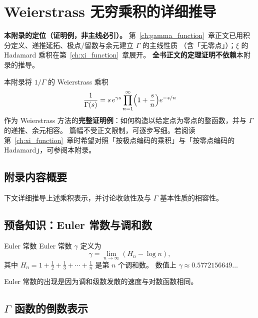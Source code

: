 

\chapter{Weierstrass 无穷乘积的详细推导}
\label{app:weierstrass}

\textbf{本附录的定位（证明例，非主线必引）。}
第~\ref{ch:gamma_function}~章正文已用积分定义、递推延拓、极点/留数与余元建立 $\Gamma$ 的主线性质
（含「无零点」）；$\xi$ 的 Hadamard 乘积在第~\ref{ch:xi_function}~章展开。
\textbf{全书正文的定理证明不依赖}本附录的推导。

本附录将 $1/\Gamma$ 的 Weierstrass 乘积
\[
  \frac{1}{\Gamma(s)}
  = s\, e^{\gamma s}
  \prod_{n=1}^{\infty}\Bigl(1+\frac{s}{n}\Bigr)e^{-s/n}
\]
作为 Weierstrass 方法的\textbf{完整证明例}：如何构造以给定点为零点的整函数，并与 $\Gamma$ 的递推、余元相容。
篇幅不受正文限制，可逐步写细。若阅读第~\ref{ch:xi_function}~章时希望对照「按极点编码的乘积」与「按零点编码的 Hadamard」，可参阅本附录。

\section*{附录内容概要}

下文详细推导上述乘积表示，并讨论收敛性及与 $\Gamma$ 基本性质的相容性。

\section{预备知识：Euler 常数与调和数}

\begin{definition}{Euler 常数}{}
Euler 常数 \(\gamma\) 定义为
\[
\gamma = \lim_{n \to \infty} \left( H_n - \log n \right),
\]
其中 \(H_n = 1 + \frac{1}{2} + \frac{1}{3} + \cdots + \frac{1}{n}\) 是第 \(n\) 个调和数。
数值上 \(\gamma \approx 0.5772156649\ldots\)
\end{definition}

Euler 常数的出现是因为调和级数发散的速度与对数函数相同。

\section{\texorpdfstring{$\Gamma$}{Gamma} 函数的倒数表示}


